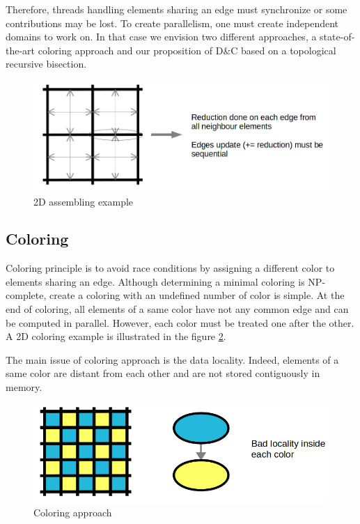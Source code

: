 \documentclass{IOS-Book-Article}
\begin{document}
Therefore, threads handling elements sharing an edge must synchronize or some contributions may be lost. To create parallelism, one must create independent domains to work on.
In that case we envision two different approaches, a state-of-the-art coloring approach and our proposition of D\&C based on a topological recursive bisection.
\begin{figure}[htp]
 \centering
 \includegraphics[scale=0.2]{2D_assembly.png}
 \caption{2D assembling example}
 \label{fig:2Dasm}
\end{figure}

\subsection{Coloring}
Coloring principle is to avoid race conditions by assigning a different color to elements sharing an edge.
Although determining a minimal coloring is NP-complete, create a coloring with an undefined number of color is simple.
At the end of coloring, all elements of a same color have not any common edge and can be computed in parallel. However, each color must be treated one after the other.
A 2D coloring example is illustrated in the figure \ref{fig:colApp}.

The main issue of coloring approach is the data locality. Indeed, elements of a same color are distant from each other and are not stored contiguously in memory.
\begin{figure}[htp]
 \centering
 \includegraphics[scale=0.25]{Coloring_approach.png}
 \caption{Coloring approach}
 \label{fig:colApp}
\end{figure}
\end{document}
